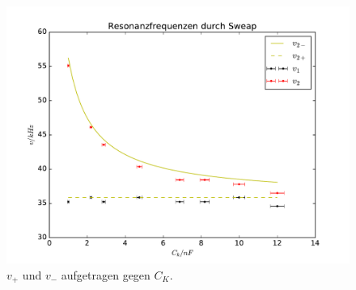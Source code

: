 \begin{figure}
  \centering
  \includegraphics[width=\textwidth]{./plots/sweap.pdf}
  \caption{$v_+$ und $v_-$ aufgetragen gegen $C_K$.}
  \label{fig:sweap}
\end{figure}
\FloatBarrier
